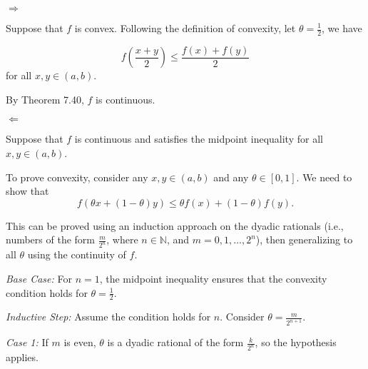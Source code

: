 \documentclass[UTF8,a4paper,10pt]{article}
\begin{document}
\(\Rightarrow \)

Suppose that \(f\) is convex. Following the definition of convexity, let \(\theta = \frac{1}{2}\), we have

\[
  f\left(\frac{x + y}{2}\right) \leq \frac{f(x) + f(y)}{2}
  \]
  for all $x, y \in (a, b)$.
  
By Theorem 7.40, \(f\) is continuous.

\dotfill

\(\Leftarrow \)











Suppose that \( f \) is continuous and satisfies the midpoint inequality for all \( x, y \in (a, b) \).

To prove convexity, consider any \( x, y \in (a, b) \) and any \( \theta \in [0, 1] \). We need to show that
\[
f(\theta x + (1-\theta) y) \leq \theta f(x) + (1-\theta) f(y).
\]

This can be proved using an induction approach on the dyadic rationals (i.e., numbers of the form \( \frac{m}{2^n} \), where \(n \in\mathbb{N}\), and \(m = 0,1,\ldots,2^n\)), then generalizing to all \( \theta \) using the continuity of \( f \).

\textit{Base Case:} For \( n=1 \), the midpoint inequality ensures that the convexity condition holds for \( \theta = \frac{1}{2} \).


\textit{Inductive Step:} Assume the condition holds for \( n \). Consider \( \theta = \frac{m}{2^{n+1}} \).

\textit{Case 1:} If \( m \) is even, \( \theta \) is a dyadic rational of the form \( \frac{k}{2^n} \), so the hypothesis applies.
\end{document}
